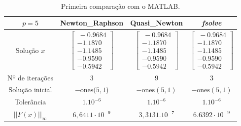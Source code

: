 \documentclass[
	12pt,				%
	oneside,			%
	a4paper,			%
	english,			%
	french,				%
	spanish,			%
	brazil				%
	]{abntex2}
\newcommand{\MATLAB}{MATLAB\textsuperscript{\textregistered}\xspace}
\begin{document}
\begin{table}[h]
    \vspace*{0,2cm}
    \centering
    \caption{Primeira comparação com o \MATLAB.}
    \begin{tabular}{|c|c|c|c|} \hline 
    $p=5$ & Newton\_Raphson & Quasi\_Newton & \textit{fsolve} \\ \hline 
    Solução $x$ & $\left[ \begin{array}{c}
    \ -0.9684 \\ 
    -1.1870 \\ 
    -1.1485 \\ 
    -0.9590 \\ 
    -0.5942 \end{array}
    \right]$ & $\left[ \begin{array}{c}
    \ -0.9684 \\ 
    -1.1870 \\ 
    -1.1485 \\ 
    -0.9590 \\ 
    -0.5942 \end{array}
    \right]$ & $\left[ \begin{array}{c}
    \ -0.9684 \\ 
    -1.1870 \\ 
    -1.1485 \\ 
    -0.9590 \\ 
    -0.5942 \end{array}
    \right]$ \\ \hline 
    \newline Nº de iterações\newline  & 3 & 9 & 3 \\ \hline 
    Solução inicial & \newline $\mathrm{-}\mathrm{ones(5,1}$)\newline  & \newline $\mathrm{-}\mathrm{ones(5,1)}$ & \newline $\mathrm{-}\mathrm{ones(5,1)}$ \\ \hline 
    \newline Tolerância\newline  & ${1.10}^{-6}$ & ${1.10}^{-6}$ & ${1.10}^{-6}$ \\ \hline 
    ${\left|\left|F\left(x\right)\right|\right|}_{\infty }$ & $6,6411\cdot {10}^{-9}$ & $3,3131.{10}^{-7}$ & $\mathrm{6.6392}\cdot {10}^{-9}$ \\ \hline 
    \end{tabular}
\end{table}
\end{document}
